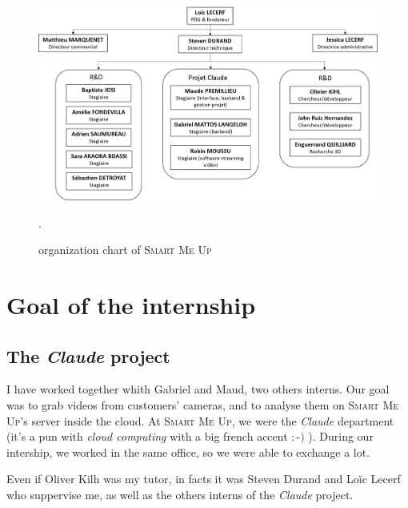 \documentclass[a4paper,11pt]{custom}
\newcommand{\smu}{\textsc{Smart Me Up}}
\newcommand{\claude}{\textit{Claude}}
\begin{document}
\vspace{\fill}
\begin{figure}[h!]
  \centering
  \def\svgwidth{\columnwidth}
  \includegraphics[width=\textwidth]{organigramme.jpg}
  \label{fig:organigramme}
  \caption{organization chart of \smu}.
\end{figure}

\chapter{Goal of the internship}

\section{The \claude{} project}

I have worked together whith Gabriel and Maud, two others interns. Our goal was
to grab videos from customers' cameras, and to analyse them on \smu's server
inside the cloud. At \smu, we were the \claude{} department (it's a pun with
\textit{cloud computing} with a big french accent $:$-$)$ ). During our
intership, we worked in the same office, so we were able to exchange a lot.

Even if Oliver Kilh was my tutor, in facts it was Steven Durand and Loïc Lecerf
who suppervise me, as well as the others interns of the \claude{} project.
\end{document}

